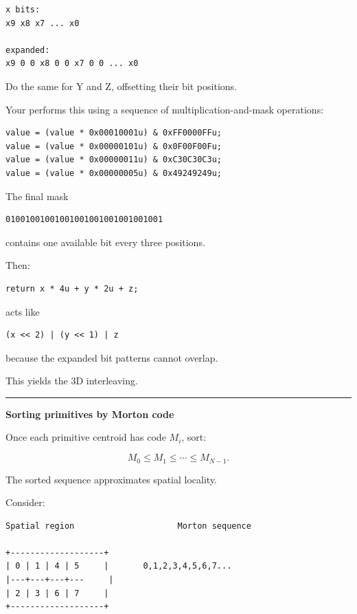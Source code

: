 \begin{verbatim}
x bits:
x9 x8 x7 ... x0

expanded:
x9 0 0 x8 0 0 x7 0 0 ... x0
\end{verbatim}

Do the same for Y and Z, offsetting their bit positions.

Your  performs this using a sequence of multiplication-and-mask operations:

\begin{verbatim}
value = (value * 0x00010001u) & 0xFF0000FFu;
value = (value * 0x00000101u) & 0x0F00F00Fu;
value = (value * 0x00000011u) & 0xC30C30C3u;
value = (value * 0x00000005u) & 0x49249249u;
\end{verbatim}

The final mask

\begin{verbatim}
01001001001001001001001001001001
\end{verbatim}

contains one available bit every three positions.

Then:

\begin{verbatim}
return x * 4u + y * 2u + z;
\end{verbatim}

acts like

\begin{verbatim}
(x << 2) | (y << 1) | z
\end{verbatim}

because the expanded bit patterns cannot overlap.

This yields the 3D interleaving.

\begin{center}\rule{0.5\linewidth}{0.5pt}\end{center}

\textbf{Sorting primitives by Morton code}

Once each primitive centroid has code \(M_i\), sort:

\[
M_0\le M_1\le\cdots\le M_{N-1}.
\]

The sorted sequence approximates spatial locality.

Consider:

\begin{verbatim}
Spatial region                     Morton sequence

+-------------------+
| 0 | 1 | 4 | 5     |       0,1,2,3,4,5,6,7...
|---+---+---+---     |
| 2 | 3 | 6 | 7     |
+-------------------+
\end{verbatim}

